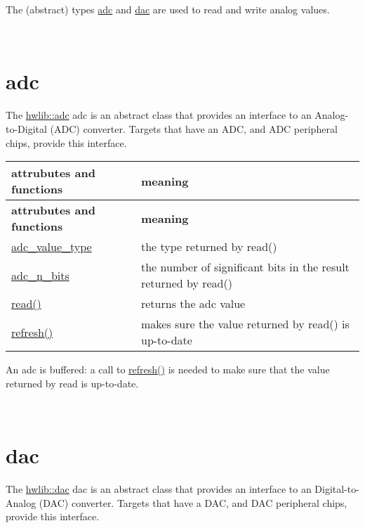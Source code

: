 The (abstract) types \hyperlink{classhwlib_1_1adc}{adc} and \hyperlink{classhwlib_1_1dac}{dac} are used to read and write analog values.

~\newline
 

\hypertarget{analog_adc}{}\section{adc}\label{analog_adc}
The \hyperlink{classhwlib_1_1adc}{hwlib\+::adc} adc is an abstract class that provides an interface to an Analog-\/to-\/\+Digital (A\+DC) converter. Targets that have an A\+DC, and A\+DC peripheral chips, provide this interface.

\tabulinesep=1mm
\begin{longtabu} spread 0pt [c]{*{2}{|X[-1]}|}
\hline
\rowcolor{\tableheadbgcolor}\textbf{ attrubutes and functions }&\textbf{ meaning  }\\
\endfirsthead
\hline
\endfoot
\hline
\rowcolor{\tableheadbgcolor}\textbf{ attrubutes and functions }&\textbf{ meaning  }\\
\endhead
\hyperlink{classhwlib_1_1adc_a1faacac0cc2f78e90652b17250cbe159}{adc\+\_\+value\+\_\+type} &the type returned by read() \\
\hyperlink{classhwlib_1_1adc_a94a0df22c46f1958f7351585bbc073ea}{adc\+\_\+n\+\_\+bits} &the number of significant bits in the result returned by read() \\
\hyperlink{classhwlib_1_1adc_ac39b506d3ae4eec08caa5aa7e69ab2fb}{read()} &returns the adc value \\
\hyperlink{classhwlib_1_1adc_a5484571b18d647ec78ba97e94c7ed836}{refresh()} &makes sure the value returned by read() is up-\/to-\/date \\
\end{longtabu}
An adc is buffered\+: a call to \hyperlink{classhwlib_1_1adc_a5484571b18d647ec78ba97e94c7ed836}{refresh()} is needed to make sure that the value returned by read is up-\/to-\/date.

~\newline
 

\hypertarget{analog_dac}{}\section{dac}\label{analog_dac}
The \hyperlink{classhwlib_1_1dac}{hwlib\+::dac} dac is an abstract class that provides an interface to an Digital-\/to-\/\+Analog (D\+AC) converter. Targets that have a D\+AC, and D\+AC peripheral chips, provide this interface.

